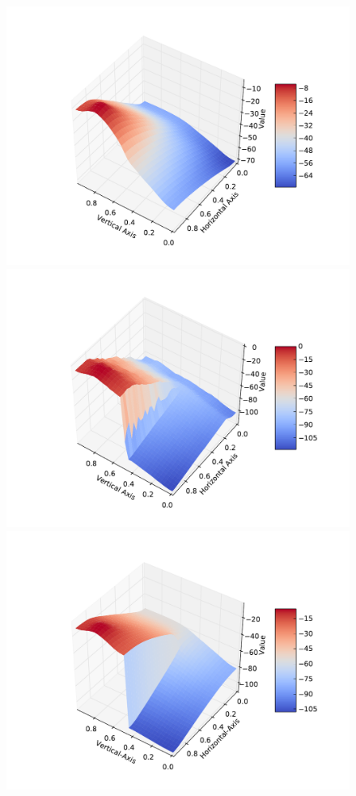 \documentclass{article} %
\begin{document}
\begin{figure}[!htb]
    \includegraphics[width=\linewidth]{../writeup/figs/blur2rmvf.pdf}
  \endminipage\hfill
    \includegraphics[width=\linewidth]{../writeup/figs/true2rmvf.pdf}
  \endminipage\hfill
    \includegraphics[width=\linewidth]{./figs/trdfvf.pdf}

\end{figure}
\end{document}
